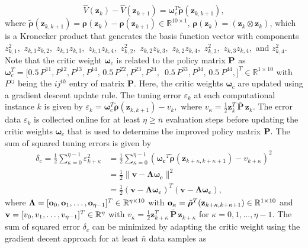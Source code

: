 \documentclass[conference]{IEEEtran}
\begin{document}
 $$\hat{V}(\mathbf{z}_k)-\hat{V}(\mathbf{z}_{k+1})=\boldsymbol{\omega}_c^T\tilde{\bm{\rho}}(\mathbf{z}_{k,k+1}),$$
 where $\tilde{\bm{\rho}}(\mathbf{z}_{k,k+1})=\bm{\rho}(\mathbf{z}_k)-\bm{\rho}(\mathbf{z}_{k+1}) \in \mathbb{R}^{10 \times 1}, \, \bm{\rho}(\mathbf{z}_k)=\left(\mathbf{z}_k\otimes\mathbf{z}_k\right)$, which is a Kronecker product that generates the basis function vector with components $z_{k,1}^2,$ $z_{k,1}z_{k,2},$ $z_{k,1}z_{k,3},$ $z_{k,1}z_{k,4},$ $z_{k,2}^2,$ $z_{k,2}z_{k,3},$ $z_{k,2}z_{k,4},$ $z_{k,3}^2,$ $z_{k,3}z_{k,4},$ and $z_{k,4}^2.$ Note that the critic weight $\bm{\omega}_c$ is related to the policy matrix ${\bf P}$ as  $\boldsymbol{\omega}_c^T = [0.5 \, P^{11},P^{12},P^{13},P^{14},  \, 0.5 \, P^{22}, P^{23},P^{24},$ $\,0.5 \, P^{33}, P^{34},\,0.5 \ P^{44}, ]^T \in \mathbb{R}^{1\times 10}$ with $P^{ij}$ being the $ij^{th}$ entry of matrix $\mathbf{P}.$ %
 Here, the critic weights $\boldsymbol{\omega}_c$ are updated using a gradient descent update rule. The tuning error $\varepsilon_k$ at each computational instance $k$ is given by $\varepsilon_k =\boldsymbol{\omega}_c^T\tilde{\bm{\rho}}(\mathbf{z}_{k,k+1})-{v}_k,$ where $v_\kappa = \frac{1}{2}\mathbf{z}_{k}^T \, \bar{\mathbf{P}} \, \mathbf{z}_{k}$. The error data $\varepsilon_k$ is collected online for at least  $\eta \ge \bar n$ evaluation steps before updating the critic weights $\boldsymbol{\omega}_c$ that is used to determine the improved policy matrix ${\bf P}.$ The sum of squared tuning errors is given by 
 \begin{align}
   \delta_c =\frac{1}{2}\sum_{\kappa=0}^{\eta-1}\varepsilon_{k+\kappa}^2 &=\frac{1}{2}\sum_{\kappa=0}^{\eta-1}(\boldsymbol{\omega_c}^T\tilde{\bm{\rho}}(\mathbf{z}_{k+\kappa,k+\kappa+1})-{v}_{k+\kappa})^2 \nonumber \\        	
   	&=\frac{1}{2}\| \mathbf{v} - \bm{\Lambda}\bm{\omega_c}\|^2 \nonumber \\
   &=\frac{1}{2}\left(\mathbf{v} - \bm{\Lambda}\bm{\omega_c}\right)^T \left(\mathbf{v} - \bm{\Lambda}\bm{\omega_c}\right), 
 \end{align}
 where $\bm{\Lambda} = [{\bf o}_0,{\bf o}_1,\ldots,{\bf o}_{\eta-1}]^T \in \mathbb{R}^{\eta\times 10}$ with ${\bf o}_\kappa = \tilde{\bm{\rho}}^T({\bf z}_{k+\kappa, k+\kappa+1}) \in \mathbb{R}^{1\times 10}$ and ${\bf v} =[v_0,v_1,\ldots,v_{\eta-1}]^T \in \mathbb{R}^{\eta}$ with $v_\kappa = \frac{1}{2}\mathbf{z}_{k+\kappa}^T \, \bar{\mathbf{P}} \, \mathbf{z}_{k+\kappa}$ for $\kappa = 0,1,\ldots, \eta-1$. %
 The sum of squared error $\delta_c$ can be minimized by adapting the critic weight using the gradient decent approach for at least $\bar n$ data samples as 
\end{document}
